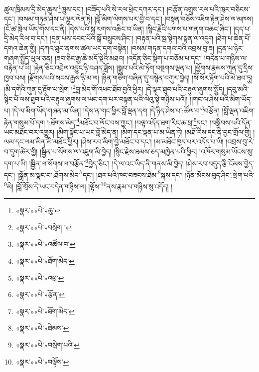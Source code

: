 ཚུལ་ཁྲིམས་དྲི་མེད་ཆུས་\footnote{«སྣར་»«པེ་»ཆུ་}ཁྲུས་དང་། །བཟོད་པའི་སེ་རལ་ཕྲེང་དཀར་དང་། །བརྩོན་འགྲུས་རལ་པའི་ཁུར་བཅིངས་དང་། །བསམ་གཏན་ཤེས་པ་ལྷུར་ལེན་ཏེ། །བློ་མིག་ལེགས་པར་བྱེ་བ་དང་། །བསྟན་བཅོས་འཇིག་རྟེན་ཤེས་ལ་མཁས། །ངོ་ཚ་ཁྲེལ་ཡོད་གོས་དང་ནི། །དེས་པའི་སྐ་རགས་འཆིང་བ་ཡིན། །སྙིང་རྗེའི་པགས་པ་གནག་འཆང་ཞིང་། །དད་པ་དྲི་མེད་རིལ་བ་དང་། །དྲན་པས་དབང་པོའི་སྒོ་བསྲུངས་ཤིང་། །བརྟན་པའི་སྦ་སྟེགས་སྟན་ལ་འདུག །ཐེག་པ་ཆེན་པོ་དགའ་ཆེན་གྱི། །དཀའ་ཐུབ་ནགས་ཚལ་ཡང་དག་བསྟེན། །བསམ་གཏན་དགའ་བའི་འབྲས་བུ་ཟ། །དྲན་པ་ཉེར་གཞག་སྤྱོད་ཡུལ་ཅན། །ཟབ་ཅིང་རྒྱ་ཆེ་མདོ་སྡེའི་མཐའ། །འདོན་ཅིང་སྡིག་པ་བཅོམ་པ་དང་། །བདེན་པ་གཉིས་ལ་བརྟེན་པ་ཡི། །རྟེན་ཅིང་འབྲེལ་འབྱུང་ཉི་བཤད་ཟློས། །སྒྲུབ་པའི་མེ་ཏོག་བསྔགས་ལྡན་པ། །ཕྱོགས་རྣམས་ཀུན་དུ་དྲིས་ཁྱབ་པས། །རྫོགས་པའི་སངས་རྒྱས་ཉི་མ་ལ། །ཉིན་གཅིག་བཞིན་དུ་བསྙེན་བཀུར་བྱེད། །སོ་སོར་རྟོག་པའི་མེ་ཐབ་ཏུ། །མི་དགེའི་ཀུན་དུ་རྟོག་པ་སྲེག །\footnote{«སྣར་»«པེ་»བསྲེག །}བླ་མེད་གོ་འཕང་ཐོབ་བྱའི་ཕྱིར། །དེ་ལྟར་ཐུབ་པའི་བརྟུལ་ཞུགས་སྤྱོད། །དབུ་མའི་སྙིང་པོ་ལས་ཐུབ་པའི་བརྟུལ་ཞུགས་ལ་ཡང་དག་པར་བསྟན་པའི་ལེའུ་སྟེ་གཉིས་པའོ།། །།གང་ལ་ཤེས་པའི་མིག་ཡོད་པ། །དེ་ལ་མིག་ཡོད་གཞན་མ་ཡིན། །དེས་ན་གང་ཕྱིར་བློ་ལྡན་དག །དེ་ཉིད་ཤེས་པ་:ཚོལ་བ་\footnote{«སྣར་»«པེ་»འཚོལ་བ་}བརྩོན། །བློ་ལྡན་འཇིག་རྟེན་གསུམ་པོ་དག །:ཐོགས་མེད་\footnote{«སྣར་»«པེ་»ཐོག་མེད་}མཐོང་བ་ལོང་བས་ཀྱང་། །བལྟ་འདོད་ཐག་རིང་ཆ་ཕྲ་\footnote{«སྣར་»«པེ་»འཕྲ་}དང་། །བསྒྲིབས་པའི་དོན་ཡང་མཐོང་བར་འགྱུར། །མིག་སྟོང་པ་ཡང་བློ་མེད་ན། །མིག་དང་ལྡན་པ་མ་ཡིན་ཏེ། །མཐོ་རིས་དང་ནི་བྱང་གྲོལ་གྱི། །ལམ་དང་ལམ་མིན་མི་མཐོང་ཕྱིར། །ཤེས་རབ་མིག་བྱེ་མཐོང་བ་དང་། །མ་མཐོང་ཁྱད་པར་འདོད་པ་ཡི། །འབྲས་བུ་རེ་བ་དུག་ཚེར་གྱི། །སྦྱིན་པ་སོགས་ལ་འཇུག་མི་བྱེད། །སྙིང་རྗེས་ཐམས་ཅད་མཁྱེན་པའི་ཕྱིར། །འཁོར་གསུམ་ཡོངས་སུ་དག་པ་ཡི། །སྦྱིན་ལ་སོགས་ལ་བརྩོན་\footnote{«སྣར་»«པེ་»རྩོན་}བྱེད་ཅིང་། །དེ་ལ་འང་ཡིད་ནི་གནས་མི་བྱེད། །ཤེས་རབ་བདུད་རྩི་ངོམས་བྱེད་དང་། །སྒྲོན་མ་སྣང་བ་:ཐོགས་མེད་\footnote{«སྣར་»«པེ་»ཐོག་མེད་}དང་། །ཐར་པའི་ཁང་བཟངས་ཐེམ་\footnote{«སྣར་»«པེ་»ཐེམས་}སྐས་དང་། །ཉོན་མོངས་བུད་ཤིང་:སྲེག་པའི་\footnote{«སྣར་»«པེ་»བསྲེག་པའི་}མེ། །བློ་གྲོས་དེ་ཡང་བདེན་གཉིས་ལ། །ལྟོས་\footnote{«སྣར་»«པེ་»བལྟོས་}ནས་རྣམ་པ་གཉིས་སུ་འདོད། །
